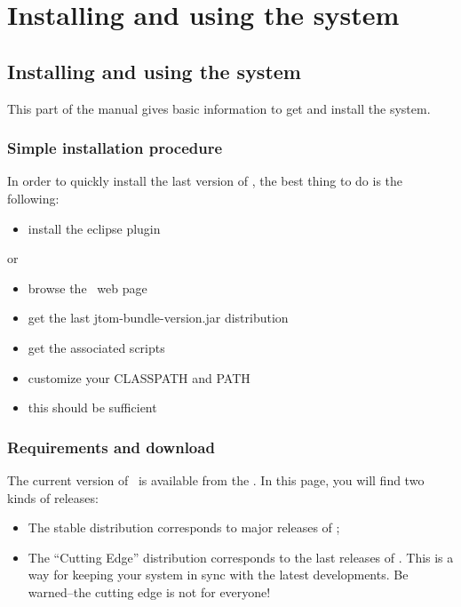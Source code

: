 \part{Installing and using the system}
\chapter{Installing and using the system}
This part of the manual gives basic information to get and install the
system.

\section{Simple installation procedure}
In order to quickly install the last version of \TOM, the best thing
to do is the following:
{\bf
\begin{itemize}
\item install the eclipse plugin
\end{itemize}
}
or
{\bf
\begin{itemize}
\item browse the \TOM\ web page~
\item get the last jtom-bundle-version.jar distribution
\item get the associated scripts
\item customize your CLASSPATH and PATH
\item this should be sufficient
\end{itemize}
}

\section{Requirements and download}
The current version of \TOM\ is available from the
.
In this page, you will find two kinds of releases:

\begin{itemize}
\item The stable distribution corresponds to major releases of \TOM;
\item The ``Cutting Edge'' distribution corresponds to the last
  releases of \TOM. This is a way for keeping your system in sync with
  the latest developments. Be warned--the cutting edge is not for
  everyone! 
\end{itemize}

